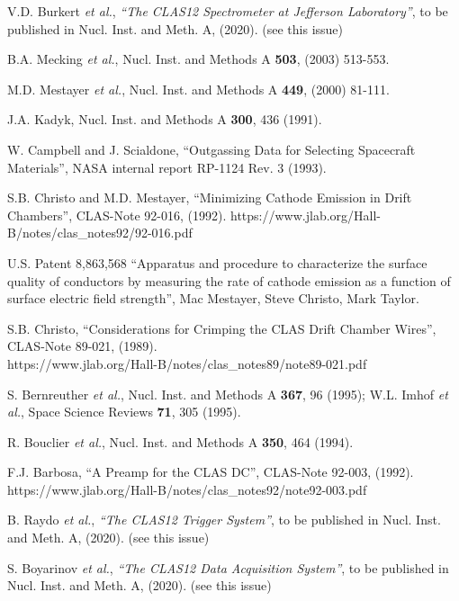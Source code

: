 \begin{thebibliography}{99}

V.D. Burkert {\it et al.}, {\it ``The CLAS12 Spectrometer at Jefferson Laboratory''}, to be published in
Nucl. Inst. and Meth. A, (2020). (see this issue)

B.A. Mecking {\it et al.}, Nucl. Inst. and Methods A {\bf 503}, (2003) 513-553.

M.D. Mestayer {\it et al.}, Nucl. Inst. and Methods A {\bf 449}, (2000) 81-111.

J.A. Kadyk, Nucl. Inst. and Methods A {\bf 300}, 436 (1991).

W. Campbell and J. Scialdone, ``Outgassing Data for Selecting Spacecraft Materials'', NASA internal
report RP-1124 Rev. 3 (1993).

S.B. Christo and M.D. Mestayer, ``Minimizing Cathode Emission in Drift Chambers'', CLAS-Note 92-016,
(1992). https://www.jlab.org/Hall-B/notes/clas\_notes92/92-016.pdf

U.S. Patent 8,863,568 ``Apparatus and procedure to characterize the surface quality 
of conductors by measuring the rate of cathode emission as a function of surface electric field 
strength'', Mac Mestayer, Steve Christo, Mark Taylor.

S.B. Christo, ``Considerations for Crimping the CLAS Drift Chamber Wires'', CLAS-Note
89-021, (1989). \\ https://www.jlab.org/Hall-B/notes/clas\_notes89/note89-021.pdf

S. Bernreuther {\it et al.}, Nucl. Inst. and Methods A {\bf 367}, 96 (1995); W.L. Imhof {\it et al.},
Space Science Reviews {\bf 71}, 305 (1995).

R. Bouclier {\it et al.}, Nucl. Inst. and Methods A {\bf 350}, 464 (1994).

F.J. Barbosa, ``A Preamp for the CLAS DC'', CLAS-Note 92-003, (1992).
https://www.jlab.org/Hall-B/notes/clas\_notes92/note92-003.pdf

B. Raydo {\it et al.}, {\it ``The CLAS12 Trigger System''}, to be published in Nucl. Inst. and Meth. A, (2020).
(see this issue)

S. Boyarinov {\it et al.}, {\it ``The CLAS12 Data Acquisition System''}, to be published in Nucl. Inst.
and Meth. A, (2020). (see this issue)


\end{thebibliography}
